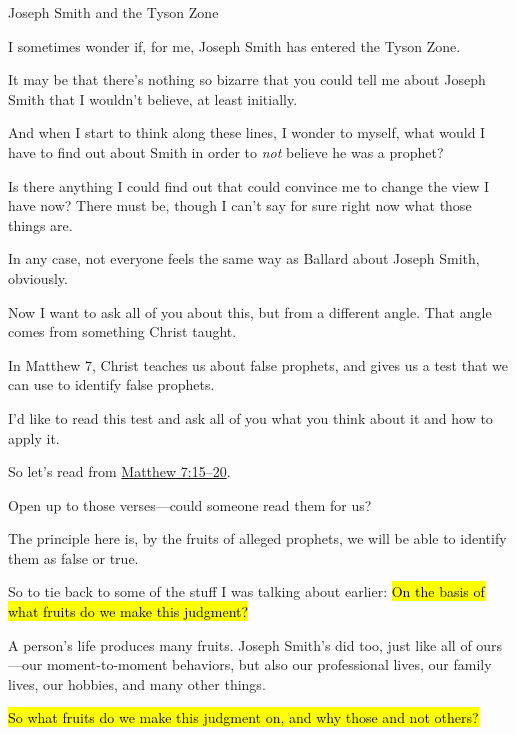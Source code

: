 \begin{compactitem}
			\item Joseph Smith and the Tyson Zone
				\begin{compactitem}
					\item I sometimes wonder if, for me, Joseph Smith has entered the Tyson Zone.
					\item It may be that there's nothing so bizarre that you could tell me about Joseph Smith that I wouldn't believe, at least initially.
					\item And when I start to think along these lines, I wonder to myself, what would I have to find out about Smith in order to \textit{not} believe he was a prophet?
					\item Is there anything I could find out that could convince me to change the view I have now? There must be, though I can't say for sure right now what those things are.
					\item In any case, not everyone feels the same way as Ballard about Joseph Smith, obviously.
					\item Now I want to ask all of you about this, but from a different angle. That angle comes from something Christ taught.
				\end{compactitem}
				
			\item In Matthew 7, Christ teaches us about false prophets, and gives us a test that we can use to identify false prophets.
				\begin{compactitem}
					\item I'd like to read this test and ask all of you what you think about it and how to apply it.
					\item So let's read from \hyperref[MATTHEW-7-15]{Matthew 7:15--20}.
					\item Open up to those verses---could someone read them for us?
					\item 
					\item The principle here is, by the fruits of alleged prophets, we will be able to identify them as false or true.
					\item So to tie back to some of the stuff I was talking about earlier: \hl{On the basis of what fruits do we make this judgment?}
						\begin{compactitem}
							\item A person's life produces many fruits. Joseph Smith's did too, just like all of ours---our moment-to-moment behaviors, but also our professional lives, our family lives, our hobbies, and many other things.
							\item \hl{So what fruits do we make this judgment on, and why those and not others?}
						\end{compactitem}
				\end{compactitem}
				

\end{compactitem}
